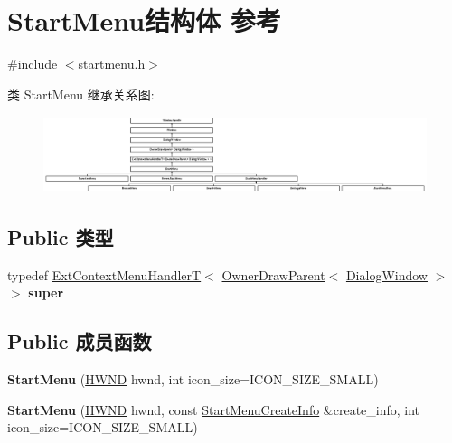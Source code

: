 \hypertarget{struct_start_menu}{}\section{Start\+Menu结构体 参考}
\label{struct_start_menu}


{\ttfamily \#include $<$startmenu.\+h$>$}

类 Start\+Menu 继承关系图\+:\begin{figure}[H]
\begin{center}
\leavevmode
\includegraphics[height=2.262626cm]{struct_start_menu}
\end{center}
\end{figure}
\subsection*{Public 类型}
\begin{DoxyCompactItemize}
\item 
\mbox{\label{struct_start_menu_a0fa1b10c4027d020d036f394bb16451c}} 
typedef \hyperlink{struct_ext_context_menu_handler_t}{Ext\+Context\+Menu\+HandlerT}$<$ \hyperlink{struct_owner_draw_parent}{Owner\+Draw\+Parent}$<$ \hyperlink{struct_dialog_window}{Dialog\+Window} $>$ $>$ {\bfseries super}
\end{DoxyCompactItemize}
\subsection*{Public 成员函数}
\begin{DoxyCompactItemize}
\item 
\mbox{\label{struct_start_menu_a5462b241ebd3847e4666facd965ec188}} 
{\bfseries Start\+Menu} (\hyperlink{interfacevoid}{H\+W\+ND} hwnd, int icon\+\_\+size=I\+C\+O\+N\+\_\+\+S\+I\+Z\+E\+\_\+\+S\+M\+A\+LL)
\item 
\mbox{\label{struct_start_menu_a354c9acb282d1801e388f13c1e8159e8}} 
{\bfseries Start\+Menu} (\hyperlink{interfacevoid}{H\+W\+ND} hwnd, const \hyperlink{struct_start_menu_create_info}{Start\+Menu\+Create\+Info} \&create\+\_\+info, int icon\+\_\+size=I\+C\+O\+N\+\_\+\+S\+I\+Z\+E\+\_\+\+S\+M\+A\+LL)
\end{DoxyCompactItemize}

